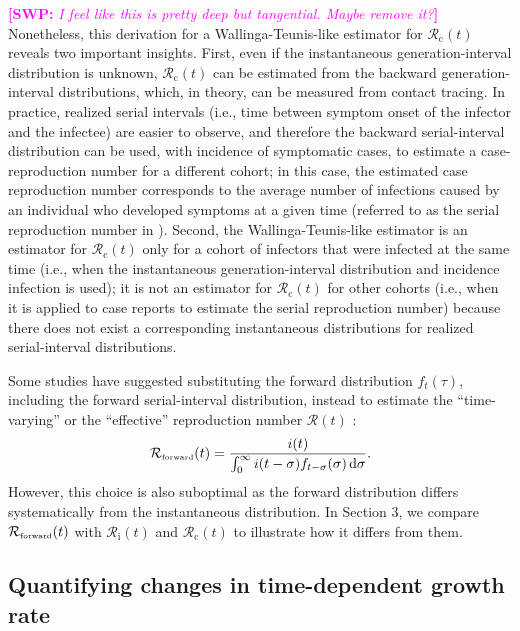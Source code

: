 \documentclass[12pt]{article}
\newcommand{\comment}{\showcomment}
\newcommand{\showcomment}[3]{\textcolor{#1}{\textbf{[#2: }\textsl{#3}\textbf{]}}}
\newcommand{\swp}[1]{\comment{magenta}{SWP}{#1}}
\newcommand{\Rx}[1]{\ensuremath{{\mathcal R}_{#1}}\xspace}
\newcommand{\Rc}{\Rx{\mathrm{c}}}
\newcommand{\Ri}{\Rx{\mathrm{i}}}
\newcommand{\RR}{\ensuremath{{\mathcal R}}\xspace}
\newcommand{\tsub}[2]{#1_{{\textrm{\tiny #2}}}}
\newcommand{\dd}[1]{\ensuremath{\, \mathrm{d}#1}}
\newcommand{\dsigma}{\dd{\sigma}}
\begin{document}
\swp{I feel like this is pretty deep but tangential. Maybe remove it?}
Nonetheless, this derivation for a Wallinga-Teunis-like estimator for $\Rc(t)$ reveals two important insights.
First, even if the instantaneous generation-interval distribution is unknown, $\Rc(t)$ can be estimated from the backward generation-interval distributions, which, in theory, can be measured from contact tracing.
In practice, realized serial intervals (i.e., time between symptom onset of the infector and the infectee) are easier to observe, and therefore the backward serial-interval distribution can be used, with incidence of symptomatic cases, to estimate a case-reproduction number for a different cohort; in this case, the estimated case reproduction number corresponds to the average number of infections caused by an individual who developed symptoms at a given time (referred to as the serial reproduction number in \cite{park2020forward}).
Second, the Wallinga-Teunis-like estimator is an estimator for $\Rc(t)$ only for a cohort of infectors that were infected at the same time (i.e., when the instantaneous generation-interval distribution and incidence infection is used);
it is not an estimator for $\Rc(t)$ for other cohorts (i.e., when it is applied to case reports to estimate the serial reproduction number) because there does not exist a corresponding instantaneous distributions for realized serial-interval distributions.

Some studies have suggested substituting the forward distribution $f_t(\tau)$, including the forward serial-interval distribution, instead to estimate the ``time-varying'' or the ``effective'' reproduction number $\RR(t)$ \citep{liu2018measurability, ali2020serial}:
\begin{equation}
\tsub{\RR}{forward}(t) = \frac{i(t)}{\int_0^\infty i(t-\sigma) f_{t-\sigma}(\sigma) \dsigma}.
\end{equation}
However, this choice is also suboptimal as the forward distribution differs systematically from the instantaneous distribution.
In Section 3, we compare $\tsub{\RR}{forward}(t)$ with $\Ri(t)$ and $\Rc(t)$ to illustrate how it differs from them.

\subsection{Quantifying changes in time-dependent growth rate}
\end{document}
